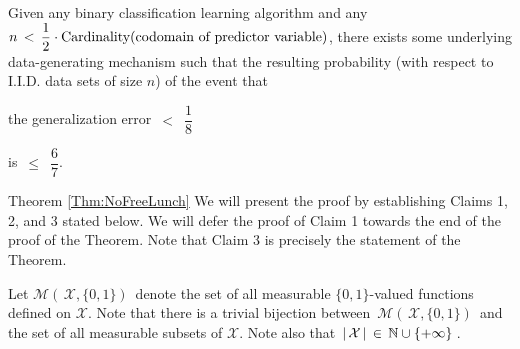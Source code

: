 
\newpage
\begin{remark}
\mbox{}\vskip 0.1cm
\noindent
Given any binary classification learning algorithm and
any \,$n \,<\, \dfrac{1}{2}\cdot\textnormal{Cardinality}(\textnormal{codomain of predictor variable})$,
there exists some underlying data-generating mechanism such that
the resulting probability (with respect to I.I.D. data sets of size $n$) of the event that
\begin{center}
the generalization error \,$<$\, $\dfrac{1}{8}$
\end{center}
is \,$\leq$\, $\dfrac{6}{7}$.
\end{remark}


\vskip 1.0cm
\proofof Theorem \ref{Thm:NoFreeLunch}
\vskip 0.3cm
\noindent
We will present the proof by establishing Claims 1, 2, and 3 stated below.
We will defer the proof of Claim 1 towards the end of the proof of the Theorem.
Note that Claim 3 is precisely the statement of the Theorem.

\vskip 0.5cm
\noindent
Let $\mathcal{M}\!\left(\,\mathcal{X},\{0,1\}\right)$\, denote the set of all measurable $\{0,1\}$-valued
functions defined on $\mathcal{X}$.
Note that there is a trivial bijection between \,$\mathcal{M}\!\left(\,\mathcal{X},\{0,1\}\right)$\, and
the set of all measurable subsets of $\mathcal{X}$.
Note also that \,$\vert\,\mathcal{X}\,\vert \,\in\, \mathbb{N}\cup\{+\infty\}$\,.

